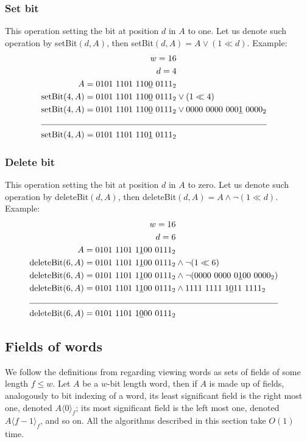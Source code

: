 \subsubsection{Set bit}
This operation setting the bit at position $d$ in $A$ to one. Let us denote such operation by setBit$(d, A)$, then setBit$(d, A) = A \vee (1 \ll d)$.
Example:
\begin{align*}
    w = 16\\
    d = 4\\
    A = 0101\ 1101\ 110\underline{0}\ 0111_2& \\
    \text{setBit}(4,A) = 0101\ 1101\ 110\underline{0}\ 0111_2& \vee (1 \ll 4) \\
    \text{setBit}(4,A) = 0101\ 1101\ 110\underline{0}\ 0111_2& \vee 0000\ 0000\ 000\underline{1}\ 0000_2 \\
    \cline{1-2}
    \text{setBit}(4,A) = 0101\ 1101\ 110\underline{1}\ 0111_2&
\end{align*}

\subsubsection{Delete bit}
This operation setting the bit at position $d$ in $A$ to zero. Let us denote such operation by deleteBit$(d, A)$, then deleteBit$(d, A) = A \wedge \neg(1 \ll d)$.
Example:
\begin{align*}
    w = 16\\
    d = 6\\
    A = 0101\ 1101\ 1\underline{1}00\ 0111_2& \\
    \text{deleteBit}(6,A) = 0101\ 1101\ 1\underline{1}00\ 0111_2& \wedge \neg(1 \ll 6) \\
    \text{deleteBit}(6,A) = 0101\ 1101\ 1\underline{1}00\ 0111_2& \wedge \neg(0000\ 0000\ 0\underline{1}00\ 0000_2) \\
    \text{deleteBit}(6,A) = 0101\ 1101\ 1\underline{1}00\ 0111_2& \wedge 1111\ 1111\ 1\underline{0}11\ 1111_2 \\
    \cline{1-2}
    \text{deleteBit}(6,A) = 0101\ 1101\ 1\underline{0}00\ 0111_2&
\end{align*}

\subsection{Fields of words}

We follow the definitions from \cite{patrascu2014dynamic} regarding viewing words as sets of fields of some length $f \leq w$. Let $A$ be a $w$-bit length word, then if $A$ is made up of fields, analogously to bit indexing of a word, its least significant field is the right most one, denoted $A\langle0\rangle_f$; its most significant field is the left most one, denoted $A\langle f-1\rangle_f$, and so on. All the algorithms described in this section take $O(1)$ time.


